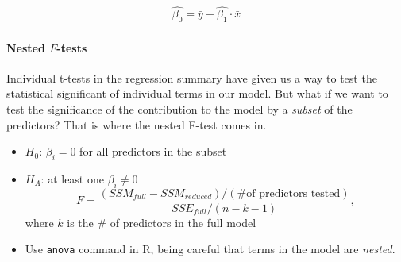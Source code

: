\documentclass[10pt]{article}
\begin{document}
\begin{eqnarray*}
\hat{\beta_0} = \bar{y}-\hat{\beta_1}\cdot\bar{x} 
\end{eqnarray*}




\paragraph{Nested $F$-tests}

Individual t-tests in the regression summary have given us a way to test the statistical significant of individual terms in our model. But what if we want to test the significance of the contribution to the model by a \emph{subset} of the predictors? That is where the nested F-test comes in. 
  \begin{itemize}
		\item $H_0$: $\beta_i=0$ for all predictors in the subset
		\item $H_{A}$: at least one $\beta_i \neq 0$
		$$
			F = \frac{(SSM_{full} - SSM_{reduced}) / (\text{\# of predictors tested})}{SSE_{full} / (n-k-1)} ,
		$$
		where $k$ is the \# of predictors in the full model
		\item Use \texttt{anova} command in R, being careful that terms in the model are \emph{nested}.
	\end{itemize}
\clearpage
\end{document}
